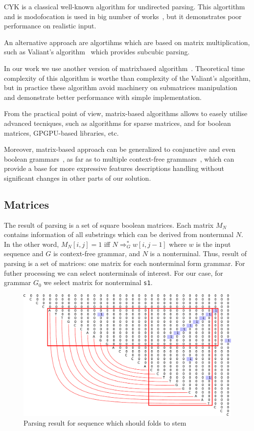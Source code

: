 \documentclass[a4paper,twoside]{article}
\begin{document}
CYK is a classical well-known algorithm for undirected parsing. 
This algortithm and is modofocation is used in big number of works~\cite{}, but it demonstrates poor performance on realistic input.

An alternative approach are algortihms which are based on matrix multiplication, such as Valiant's algorithm~\cite{Valiant:1975:GCR:1739932.1740048} which provides subcubic parsing.

In our work we use another version of matrixbased algorithm~\cite{Azimov:2018:CPQ:3210259.3210264}.
Theoretical time complexity of this algorithm is worthe than complexity of the Valiant's algorithm, but in practice these algorithm avoid machinery on submatrices manipulation and demonstrate better performance with simple implementation.

From the practical point of view, matrix-based algorithms allows to easely utilise advanced tecniques, such as algorithms for sparse matrices, and for boolean matrices, GPGPU-based libraries, etc.

Moreover, matrix-based approach can be generalized to conjunctive and even boolean grammars~\cite{OKHOTIN2014101}, as far as to multiple context-free grammars~\cite{mcfgMatrices}, which can provide a base for more expressive features descriptions handling without significant changes in other parts of our solution.

\subsection{Matrices}

\noindent The result of parsing is a set of square boolean matrices. 
Each matrix $M_N$ contains information of all substrings which can be derived from nontermnal $N$.
In the other word, $M_N[i,j]=1$ iff $N \Rightarrow^*_G w[i,j-1]$ where $w$ is the input sequence and $G$ is context-free grammar, and $N$ is a nonterminal.
Thus, result of parsing is a set of matrices: one matrix for each nonterminal form grammar.
For futher processing we can select nonterminals of interest.
For our case, for grammar $G_0$ we select matrix for nonterminal \verb|s1|.

\begin{figure}
\centering
\includegraphics[width=.5\textwidth]{figures/4.pdf}
\caption{Parsing result for sequence which should folds to stem}
\label{fig:matrix-simple-stem}
\end{figure}
\end{document}

